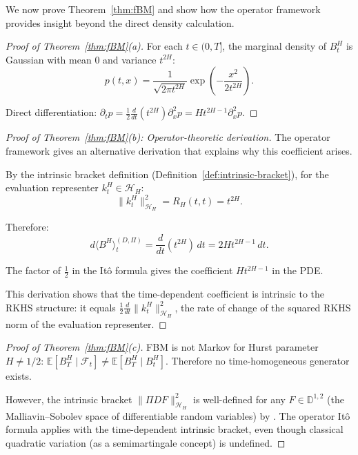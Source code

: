 \documentclass[12pt]{article}
\theoremstyle{plain}
\theoremstyle{definition}
\theoremstyle{remark}
\newcommand{\E}{\mathbb{E}}
\newcommand{\F}{\mathcal{F}}
\newcommand{\HH}{\mathcal{H}}
\begin{document}
We now prove Theorem~\ref{thm:fBM} and show how the operator framework provides insight beyond the direct density calculation.

\begin{proof}[Proof of Theorem~\ref{thm:fBM}(a)]
For each $t \in (0,T]$, the marginal density of $B_t^H$ is Gaussian with mean $0$ and variance $t^{2H}$:
\begin{equation}\label{eq:fBM-density}
p(t,x) = \frac{1}{\sqrt{2\pi t^{2H}}} \exp\left(-\frac{x^2}{2t^{2H}}\right).
\end{equation}

Direct differentiation: $\partial_t p = \frac{1}{2}\frac{d}{dt}(t^{2H}) \partial_x^2 p = Ht^{2H-1} \partial_x^2 p$.
\end{proof}

\begin{proof}[Proof of Theorem~\ref{thm:fBM}(b): Operator-theoretic derivation]
The operator framework gives an alternative derivation that explains why this coefficient arises.

By the intrinsic bracket definition (Definition~\ref{def:intrinsic-bracket}), for the evaluation representer $k_t^H \in \HH_H$:
\begin{equation}\label{eq:fBM-representer-norm}
\|k_t^H\|_{\HH_H}^2 = R_H(t,t) = t^{2H}.
\end{equation}

Therefore:
\begin{equation}\label{eq:fBM-bracket-derivative}
d\langle B^H \rangle_t^{(D,\Pi)} = \frac{d}{dt}(t^{2H}) \, dt = 2Ht^{2H-1} \, dt.
\end{equation}

The factor of $\frac{1}{2}$ in the It\^{o} formula gives the coefficient $Ht^{2H-1}$ in the PDE.

This derivation shows that the time-dependent coefficient is intrinsic to the RKHS structure: it equals $\frac{1}{2}\frac{d}{dt}\|k_t^H\|_{\HH_H}^2$, the rate of change of the squared RKHS norm of the evaluation representer.
\end{proof}

\begin{proof}[Proof of Theorem~\ref{thm:fBM}(c)]
FBM is not Markov for Hurst parameter $H \neq 1/2$: $\E[B_T^H \mid \F_t] \neq \E[B_T^H \mid B_t^H]$. Therefore no time-homogeneous generator exists.

However, the intrinsic bracket $\|\Pi DF\|_{\HH_H}^2$ is well-defined for any $F \in \mathbb{D}^{1,2}$ (the Malliavin--Sobolev space of differentiable random variables) by \cite[Theorem 3.1]{Fontes2026b}. The operator It\^{o} formula applies with the time-dependent intrinsic bracket, even though classical quadratic variation (as a semimartingale concept) is undefined.
\end{proof}
\end{document}

